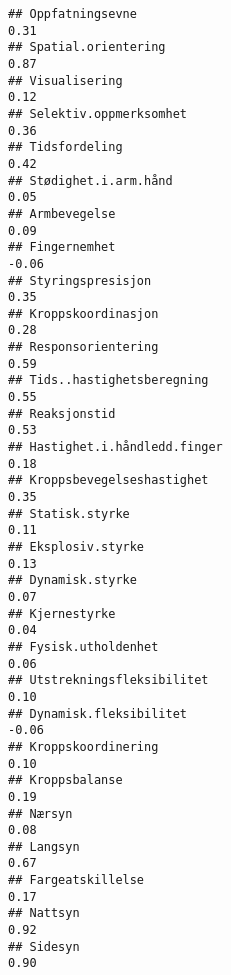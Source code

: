 \documentclass[
]{article}
\begin{document}
\begin{verbatim}
## Oppfatningsevne                                                                   0.31
## Spatial.orientering                                                               0.87
## Visualisering                                                                     0.12
## Selektiv.oppmerksomhet                                                            0.36
## Tidsfordeling                                                                     0.42
## Stødighet.i.arm.hånd                                                              0.05
## Armbevegelse                                                                      0.09
## Fingernemhet                                                                     -0.06
## Styringspresisjon                                                                 0.35
## Kroppskoordinasjon                                                                0.28
## Responsorientering                                                                0.59
## Tids..hastighetsberegning                                                         0.55
## Reaksjonstid                                                                      0.53
## Hastighet.i.håndledd.finger                                                       0.18
## Kroppsbevegelseshastighet                                                         0.35
## Statisk.styrke                                                                    0.11
## Eksplosiv.styrke                                                                  0.13
## Dynamisk.styrke                                                                   0.07
## Kjernestyrke                                                                      0.04
## Fysisk.utholdenhet                                                                0.06
## Utstrekningsfleksibilitet                                                         0.10
## Dynamisk.fleksibilitet                                                           -0.06
## Kroppskoordinering                                                                0.10
## Kroppsbalanse                                                                     0.19
## Nærsyn                                                                            0.08
## Langsyn                                                                           0.67
## Fargeatskillelse                                                                  0.17
## Nattsyn                                                                           0.92
## Sidesyn                                                                           0.90

\end{verbatim}
\end{document}
